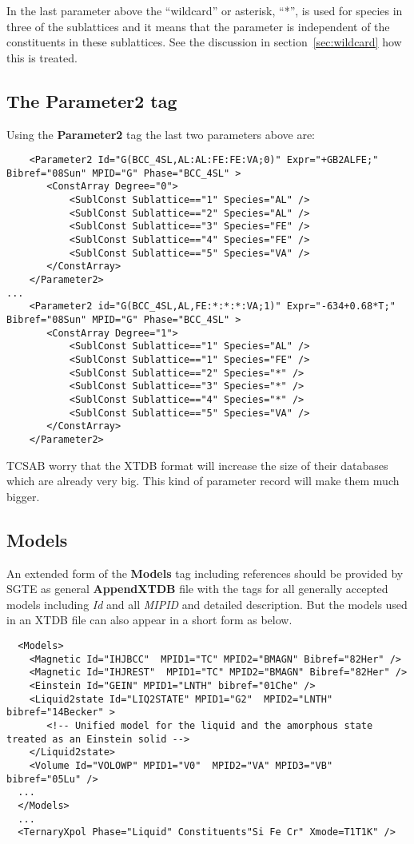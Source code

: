 \documentclass{article}
\begin{document}
\begin{appendices}
In the last parameter above the ``wildcard'' or asterisk, ``*'', is
used for species in three of the sublattices and it means that the
parameter is independent of the constituents in these sublattices.
See the discussion in section~\ref{sec:wildcard} how this is treated.


\subsection{The Parameter2 tag}

Using the {\bf Parameter2} tag the last two parameters above are:

{\small
\begin{verbatim}
    <Parameter2 Id="G(BCC_4SL,AL:AL:FE:FE:VA;0)" Expr="+GB2ALFE;" Bibref="08Sun" MPID="G" Phase="BCC_4SL" >
       <ConstArray Degree="0">
           <SublConst Sublattice=="1" Species="AL" />
           <SublConst Sublattice=="2" Species="AL" />
           <SublConst Sublattice=="3" Species="FE" />
           <SublConst Sublattice=="4" Species="FE" />
           <SublConst Sublattice=="5" Species="VA" />
       </ConstArray>
    </Parameter2>
...
    <Parameter2 id="G(BCC_4SL,AL,FE:*:*:*:VA;1)" Expr="-634+0.68*T;" Bibref="08Sun" MPID="G" Phase="BCC_4SL" >
       <ConstArray Degree="1">
           <SublConst Sublattice=="1" Species="AL" />
           <SublConst Sublattice=="1" Species="FE" />
           <SublConst Sublattice=="2" Species="*" />
           <SublConst Sublattice=="3" Species="*" />
           <SublConst Sublattice=="4" Species="*" />
           <SublConst Sublattice=="5" Species="VA" />
       </ConstArray>
    </Parameter2>
\end{verbatim}
}

TCSAB worry that the XTDB format will increase the size of their
databases which are already very big.  This kind of parameter record
will make them much bigger.

\subsection{Models}\label{sec:modelex}

An extended form of the {\bf Models} tag including references should
be provided by SGTE as general {\bf AppendXTDB} file with the tags
for all generally accepted models including {\em Id} and all {\em
  MIPID} and detailed description.  But the models used in an XTDB
file can also appear in a short form as below.

{\small
\begin{verbatim}
  <Models>
    <Magnetic Id="IHJBCC"  MPID1="TC" MPID2="BMAGN" Bibref="82Her" />
    <Magnetic Id="IHJREST"  MPID1="TC" MPID2="BMAGN" Bibref="82Her" />
    <Einstein Id="GEIN" MPID1="LNTH" bibref="01Che" /> 
    <Liquid2state Id="LIQ2STATE" MPID1="G2"  MPID2="LNTH" bibref="14Becker" >
       <!-- Unified model for the liquid and the amorphous state treated as an Einstein solid -->
    </Liquid2state>
    <Volume Id="VOLOWP" MPID1="V0"  MPID2="VA" MPID3="VB" bibref="05Lu" />
  ...
  </Models>
  ...
  <TernaryXpol Phase="Liquid" Constituents"Si Fe Cr" Xmode=T1T1K" />
\end{verbatim}
}


\end{appendices}
\end{document}

